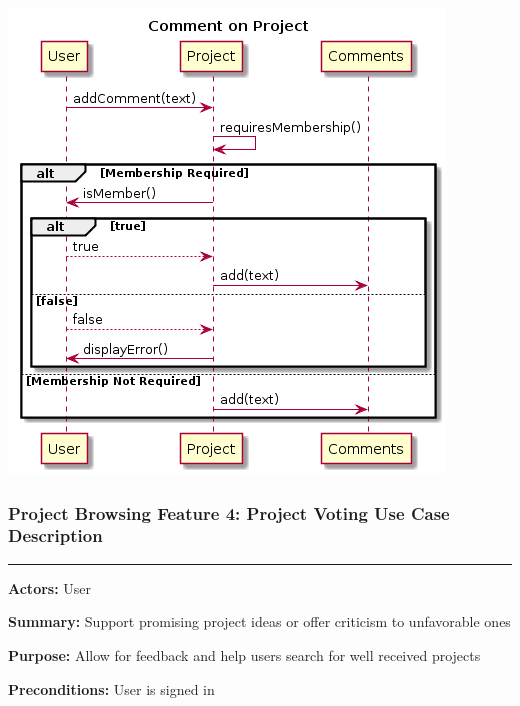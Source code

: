 \documentclass[twoside,letterpaper]{article}
\begin{document}
\includegraphics[width=\textwidth]{images/SequenceDiagrams/ProjectBrowsingProjectCommenting}

\newpage
\subsubsection[Project Browsing Feature 4: Project Voting Use Case Description]{\rmfamily\bfseries\color{black}
Project Browsing Feature 4: Project Voting Use Case Description}
\hypertarget{RefHeading22059017292}{}

\vspace{2pt}
\hrule
\vspace{8pt}
\textbf{Actors:} User \newline

\noindent\textbf{Summary:} Support promising project ideas or offer criticism to unfavorable ones  \newline

\noindent\textbf{Purpose:} Allow for feedback and help users search for well received projects \newline

\noindent\textbf{Preconditions:} User is signed in \newline
\end{document}
